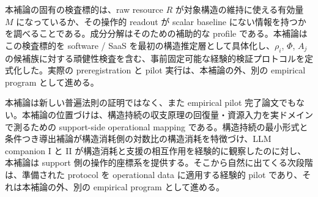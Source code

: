 \documentclass[12pt,a4paper]{article}
\begin{document}
本補論の固有の検査標的は、raw resource \(R\) が対象構造の維持に使える有効量 \(M\) になっているか、その操作的 readout が scalar baseline にない情報を持つかを調べることである。成分分解はそのための補助的な profile である。本補論はこの検査標的を software / SaaS を最初の構造推定層として具体化し、\(\rho_i\), \(\Phi\), \(A_j\) の候補族に対する頑健性検査を含む、事前固定可能な経験的検証プロトコルを定式化した。実際の preregistration と pilot 実行は、本補論の外、別の empirical program として進める。

本補論は新しい普遍法則の証明ではなく、また empirical pilot 完了論文でもない。本補論の位置づけは、構造持続の収支原理の回復量・資源入力を実ドメインで測るための support-side operational mapping である。構造持続の最小形式と条件つき導出補論が構造消耗側の対数比の構造消耗を特徴づけ、LLM companion I と II が構造消耗と支援の相互作用を経験的に観察したのに対し、本補論は support 側の操作的座標系を提供する。そこから自然に出てくる次段階は、準備された protocol を operational data に適用する経験的 pilot であり、それは本補論の外、別の empirical program として進める。
\end{document}
